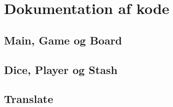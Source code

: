 \section{Dokumentation af kode}

\subsection{Main, Game og Board}

\subsection{Dice, Player og Stash}

\subsection{Translate}